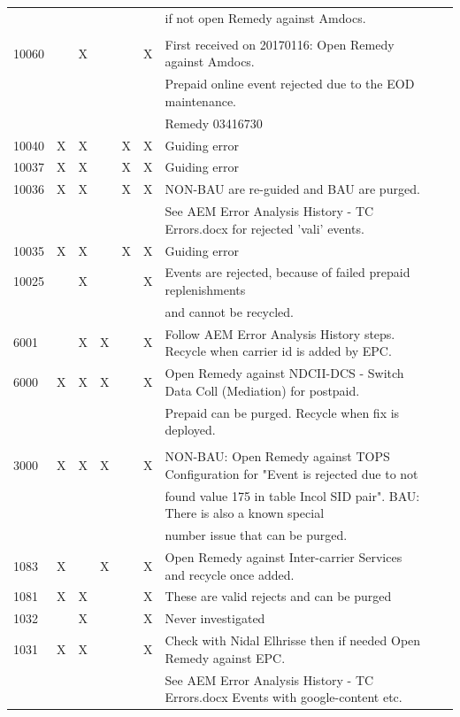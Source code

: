 \documentclass[12pt,twoside]{article}
\begin{document}
\begin{landscape}
\begin{longtable}{l|l|l|l|l|l|l|l|l}
 &  &  &  &  &  & if not open Remedy against Amdocs.\\
 &  &  &  &  &  & \\
10060 &  & X &  &  & X & First received on 20170116:  Open Remedy against Amdocs.\\
 &  &  &  &  &  & Prepaid online event rejected due to the EOD maintenance.\\
 &  &  &  &  &  & Remedy 03416730\\
10040 & X & X &  & X & X & Guiding error\\
10037 & X & X &  & X & X & Guiding error\\
10036 & X & X &  & X & X & NON-BAU are re-guided and BAU are purged.\\
 &  &  &  &  &  & See AEM Error Analysis History - TC Errors.docx  for rejected 'vali' events.\\
10035 & X & X &  & X & X & Guiding error\\
10025 &  & X &  &  & X & Events are rejected, because of failed prepaid replenishments\\
 &  &  &  &  &  & and cannot be recycled.\\
6001 &  & X & X &  & X & Follow AEM Error Analysis History steps.  Recycle when carrier id is added by EPC.\\
6000 & X & X & X &  & X & Open Remedy against NDCII-DCS - Switch Data Coll (Mediation) for postpaid.\\
 &  &  &  &  &  & Prepaid can be purged.  Recycle when fix is deployed.\\
 &  &  &  &  &  & \\
3000 & X & X & X &  & X & NON-BAU: Open Remedy against TOPS Configuration for "Event is rejected due to not\\
 &  &  &  &  &  & found value 175 in table Incol SID pair".  BAU:  There is also a known special\\
 &  &  &  &  &  & number issue that can be purged.\\
1083 & X &  & X &  & X & Open Remedy against Inter-carrier Services and recycle once added.\\
1081 & X & X &  &  & X & These are valid rejects and can be purged\\
1032 &  & X &  &  & X & Never investigated\\
1031 & X & X &  &  & X & Check with Nidal Elhrisse then if needed Open Remedy against EPC.\\
 &  &  &  &  &  & See AEM Error Analysis History - TC Errors.docx  Events with google-content etc.\\

\end{longtable}
\end{landscape}
\end{document}
